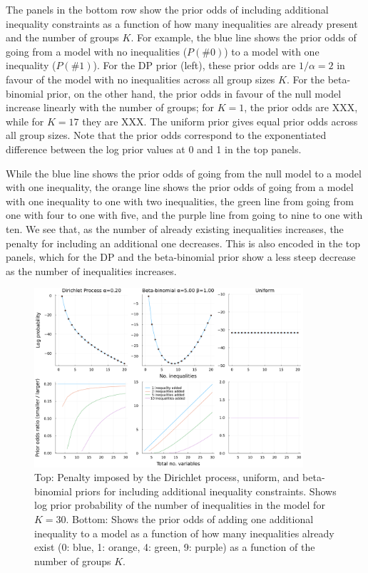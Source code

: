 \documentclass[11pt,a4paper]{article}
\theoremstyle{definition} %
\theoremstyle{case}
\begin{document}
The panels in the bottom row show the prior odds of including additional inequality constraints as a function of how many inequalities are already present and the number of groups $K$. For example, the blue line shows the prior odds of going from a model with no inequalities ($P(\#0)$) to a model with one inequality ($P(\#1)$). For the DP prior (left), these prior odds are $1 / \alpha = 2$ in favour of the model with no inequalities across all group sizes $K$. For the beta-binomial prior, on the other hand, the prior odds in favour of the null model increase linearly with the number of groups; for $K = 1$, the prior odds are XXX, while for $K = 17$ they are XXX. The uniform prior gives equal prior odds across all group sizes. Note that the prior odds correspond to the exponentiated difference between the log prior values at 0 and 1 in the top panels.

While the blue line shows the prior odds of going from the null model to a model with one inequality, the orange line shows the prior odds of going from a model with one inequality to one with two inequalities, the green line from going from one with four to one with five, and the purple line from going to nine to one with ten. We see that, as the number of already existing inequalities increases, the penalty for including an additional one decreases. This is also encoded in the top panels, which for the DP and the beta-binomial prior show a less steep decrease as the number of inequalities increases.

\begin{figure}
    \centering
    \includegraphics[width=0.89\textwidth]{figures/prior_comparison_plot_2x4_without_log_without_betabinomial.pdf}
    \caption{Top: Penalty imposed by the Dirichlet process, uniform, and beta-binomial priors for including additional inequality constraints. Shows log prior probability of the number of inequalities in the model for $K = 30$. Bottom: Shows the prior odds of adding one additional inequality to a model as a function of how many inequalities already exist (0: blue, 1: orange, 4: green, 9: purple) as a function of the number of groups $K$.}
    \label{fig:scott_berger}
\end{figure}
\end{document}
